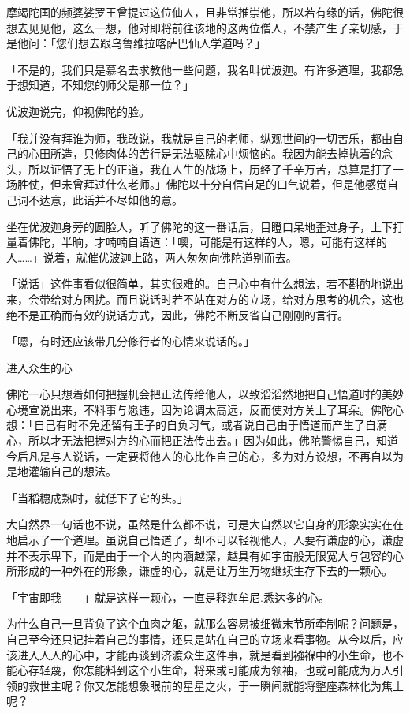 \documentclass[12pt,twoside,openany]{book}
\begin{document}
摩竭陀国的频婆娑罗王曾提过这位仙人，且非常推崇他，所以若有缘的话，佛陀很想去见见他，这么一想，他对即将前往该地的这两位僧人，不禁产生了亲切感，于是他问：「您们想去跟乌鲁维拉喀萨巴仙人学道吗？」

「不是的，我们只是慕名去求教他一些问题，我名叫优波迦。有许多道理，我都急于想知道，不知您的师父是那一位？」

优波迦说完，仰视佛陀的脸。

「我并没有拜谁为师，我敢说，我就是自己的老师，纵观世间的一切苦乐，都由自己的心田所造，只修肉体的苦行是无法驱除心中烦恼的。我因为能去掉执着的念头，所以证悟了无上的正道，我在人生的战场上，历经了千辛万苦，总算是打了一场胜仗，但未曾拜过什么老师。」佛陀以十分自信自足的口气说着，但是他感觉自己词不达意，此话并不尽如他的意。

坐在优波迦身旁的圆脸人，听了佛陀的这一番话后，目瞪口呆地歪过身子，上下打量着佛陀，半晌，才喃喃自语道：「噢，可能是有这样的人，嗯，可能有这样的人……」说着，就催优波迦上路，两人匆匆向佛陀道别而去。

「说话」这件事看似很简单，其实很难的。自己心中有什么想法，若不斟酌地说出来，会带给对方困扰。而且说话时若不站在对方的立场，给对方思考的机会，这也绝不是正确而有效的说话方式，因此，佛陀不断反省自己刚刚的言行。

「嗯，有时还应该带几分修行者的心情来说话的。」

进入众生的心

佛陀一心只想着如何把握机会把正法传给他人，以致滔滔然地把自己悟道时的美妙心境宣说出来，不料事与愿违，因为论调太高远，反而使对方关上了耳朵。佛陀心想：「自己有时不免还留有王子的自负习气，或者说自己由于悟道而产生了自满心，所以才无法把握对方的心而把正法传出去。」因为如此，佛陀警惕自己，知道今后凡是与人说话，一定要将他人的心比作自己的心，多为对方设想，不再自以为是地灌输自己的想法。

「当稻穗成熟时，就低下了它的头。」

大自然界一句话也不说，虽然是什么都不说，可是大自然以它自身的形象实实在在地启示了一个道理。虽说自己悟道了，却不可以轻视他人，人要有谦虚的心，谦虚并不表示卑下，而是由于一个人的内涵越深，越具有如宇宙般无限宽大与包容的心所形成的一种外在的形象，谦虚的心，就是让万生万物继续生存下去的一颗心。

「宇宙即我——」就是这样一颗心，一直是释迦牟尼.悉达多的心。

为什么自己一旦背负了这个血肉之躯，就那么容易被细微末节所牵制呢？问题是，自己至今还只记挂着自己的事情，还只是站在自己的立场来看事物。从今以后，应该进入人人的心中，才能再谈到济渡众生这件事，就是看到襁褓中的小生命，也不能心存轻蔑，你怎能料到这个小生命，将来或可能成为领袖，也或可能成为万人引领的救世主呢？你又怎能想象眼前的星星之火，于一瞬间就能将整座森林化为焦土呢？
\end{document}
